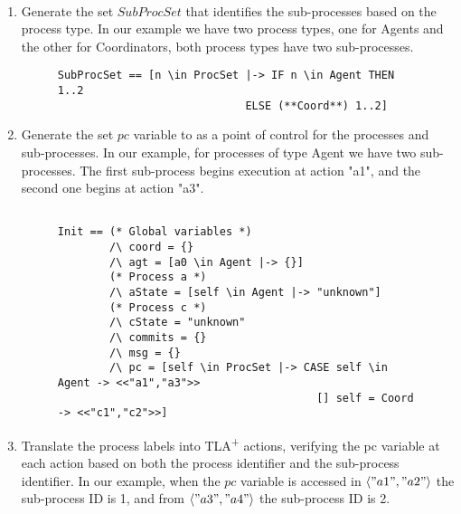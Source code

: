 \documentclass{thesul}
\newcommand{\tlaplus}{TLA\textsuperscript{+}\xspace}
\newcommand{\seq}[1]{\langle #1 \rangle}
\begin{document}
\hfill\\
\begin{enumerate}

\item Generate the set $SubProcSet$ that identifies the sub-processes based on the process type.
In our example we have two process types, one for Agents and the other for Coordinators, both process types have two sub-processes.

\FloatBarrier
\begin{figure}[!h]
\label{2pcSubTla}
\begin{lstlisting}[caption = Distributed-PlusCal Translation- SubProcSet, frame = tlrb, firstnumber = 1]
SubProcSet == [n \in ProcSet |-> IF n \in Agent THEN 1..2
                             ELSE (**Coord**) 1..2]

\end{lstlisting}
\end{figure}
\FloatBarrier

\item Generate the set $pc$ variable to as a point of control for the processes and sub-processes.
In our example, for processes of type Agent we have two sub-processes. The first sub-process begins execution at action "a1", and the second one begins at action "a3".
\hfill\\

\FloatBarrier
\begin{figure}[!h]
\begin{lstlisting}[caption = TLA+ translation for Sub-Processes, frame = tlrb, firstnumber = 1]

Init == (* Global variables *)
        /\ coord = {}
        /\ agt = [a0 \in Agent |-> {}]
        (* Process a *)
        /\ aState = [self \in Agent |-> "unknown"]
        (* Process c *)
        /\ cState = "unknown"
        /\ commits = {}
        /\ msg = {}
        /\ pc = [self \in ProcSet |-> CASE self \in Agent -> <<"a1","a3">>
                                        [] self = Coord -> <<"c1","c2">>]
\end{lstlisting}
\end{figure}
\FloatBarrier

\item Translate the process labels into \tlaplus actions, verifying the pc variable at each action based on both the process identifier and the sub-process identifier.
In our example, when the $pc$ variable is accessed in $\seq{"a1", "a2"}$ the sub-process ID is 1, and from $\seq{"a3", "a4"}$ the sub-process ID is 2.


\end{enumerate}
\end{document}
